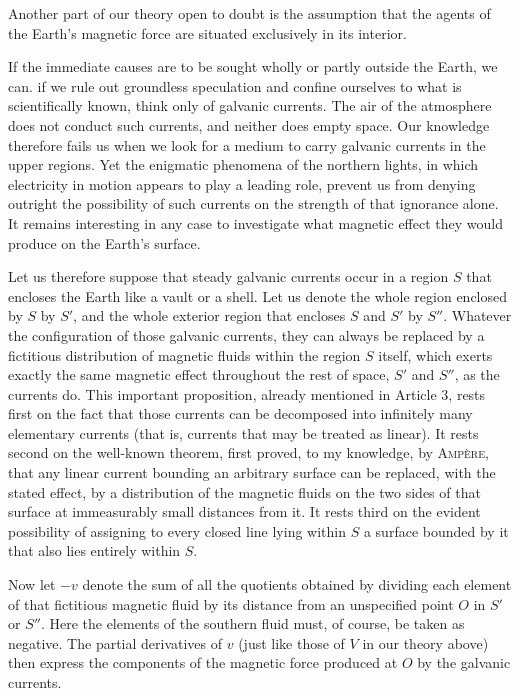 Another part of our theory open to doubt is the assumption that the agents of the Earth's magnetic force are situated exclusively in its interior.

If the immediate causes are to be sought wholly or partly outside the Earth, we can. if we rule out groundless speculation and confine ourselves to what is scientifically known, think only of galvanic currents. The air of the atmosphere does not conduct such currents, and neither does empty space. Our knowledge therefore fails us when we look for a medium to carry galvanic currents in the upper regions. Yet the enigmatic phenomena of the northern lights, in which electricity in motion appears to play a leading role, prevent us from denying outright the possibility of such currents on the strength of that ignorance alone. It remains interesting in any case to investigate what magnetic effect they would produce on the Earth's surface.

Let us therefore suppose that steady galvanic currents occur in a region $S$ that encloses the Earth like a vault or a shell. Let us denote the whole region enclosed by $S$ by $S'$, and the whole exterior region that encloses $S$ and $S'$ by $S''$. Whatever the configuration of those galvanic currents, they can always be replaced by a fictitious distribution of magnetic fluids within the region $S$ itself, which exerts exactly the same magnetic effect throughout the rest of space, $S'$ and $S''$, as the currents do. This important proposition, already mentioned in Article 3, rests first on the fact that those currents can be decomposed into infinitely many elementary currents (that is, currents that may be treated as linear). It rests second on the well-known theorem, first proved, to my knowledge, by \textsc{Ampère}, that any linear current bounding an arbitrary surface can be replaced, with the stated effect, by a distribution of the magnetic fluids on the two sides of that surface at immeasurably small distances from it. It rests third on the evident possibility of assigning to every closed line lying within $S$ a surface bounded by it that also lies entirely within $S$.

Now let $-v$ denote the sum of all the quotients obtained by dividing each element of that fictitious magnetic fluid by its distance from an unspecified point $O$ in $S'$ or $S''$. Here the elements of the southern fluid must, of course, be taken as negative. The partial derivatives of $v$ (just like those of $V$ in our theory above) then express the components of the magnetic force produced at $O$ by the galvanic currents.


